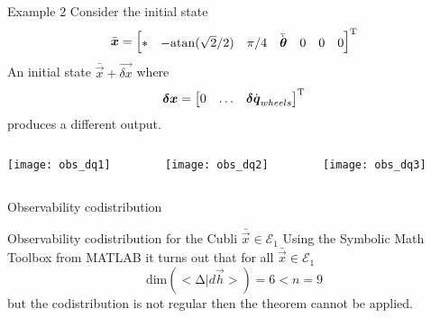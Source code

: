 \begin{frame}{Example 2 \cubli}
  Consider the initial state 
  \[
  \bar{\boldsymbol{x}} = 
  \begin{bmatrix}
    * & -\mathrm{atan}(\sqrt{2}/2) & \pi/4 & \bar{\dot{\boldsymbol{\theta}}} & 0 & 0 & 0
  \end{bmatrix}^{\mathrm{T}}
  \]
  An initial state $\bar{\vec{x}} + \vec{\delta x}$ where
  \[
  \boldsymbol{\delta x} = \begin{bmatrix}
    0 & \hdots & \boldsymbol{\delta}\dot{\boldsymbol{q}}_{wheels}
  \end{bmatrix}^{\mathrm{T}}
  \]
  produces a different output.
  \begin{columns}
    \begin{column}{0.37\textwidth}
      \texttt{[image: obs\_dq1]}
    \end{column}
    \begin{column}{0.37\textwidth}
      \texttt{[image: obs\_dq2]}
    \end{column}
    \begin{column}{0.37\textwidth}
      \texttt{[image: obs\_dq3]}
    \end{column}
  \end{columns}
\end{frame}

\begin{frame}{Observability codistribution \cubli}
  \begin{exampleblock}{Observability codistribution for the Cubli \hfill $\bar{\vec{x}} \in \mathcal{E}_{1}$}
    Using the Symbolic Math Toolbox from MATLAB it turns out that for all $\bar{\vec{x}} \in \mathcal{E}_{1}$
    \[
    \mathrm{dim} (<\mathrm{\Delta} | d\vec{h}>) = 6 < n = 9
    \]
    but the codistribution is \alert{not} regular then the theorem \alert{cannot} be applied.
  \end{exampleblock}
\end{frame}
